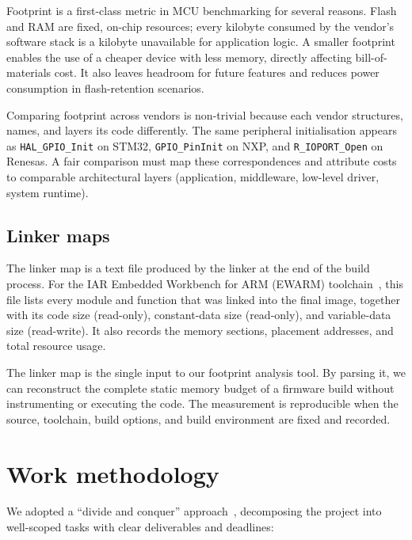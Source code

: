 Footprint is a first-class metric in MCU benchmarking for several reasons. Flash and RAM
are fixed, on-chip resources; every kilobyte consumed by the vendor's software stack is a
kilobyte unavailable for application logic. A smaller footprint enables the use of a
cheaper device with less memory, directly affecting bill-of-materials cost. It also leaves
headroom for future features and reduces power consumption in flash-retention scenarios.

Comparing footprint across vendors is non-trivial because each vendor structures, names,
and layers its code differently. The same peripheral initialisation appears as
\texttt{HAL\_GPIO\_Init} on STM32, \texttt{GPIO\_PinInit} on NXP, and \texttt{R\_IOPORT\_Open}
on Renesas. A fair comparison must map these correspondences and attribute costs to
comparable architectural layers (application, middleware, low-level driver, system runtime).

\subsection{Linker maps}
\label{sec:linker-maps}

The linker map is a text file produced by the linker at the end of the build process. For
the IAR Embedded Workbench for ARM (EWARM) toolchain~\cite{iar-ewarm}, this file lists
every module and function that was linked into the final image, together with its code size
(read-only), constant-data size (read-only), and variable-data size (read-write). It also
records the memory sections, placement addresses, and total resource usage.

The linker map is the single input to our footprint analysis tool. By parsing it, we can
reconstruct the complete static memory budget of a firmware build without instrumenting or
executing the code. The measurement is reproducible when the source, toolchain, build
options, and build environment are fixed and recorded.

\section{Work methodology}
\label{sec:methodology}

We adopted a ``divide and conquer'' approach~\cite{divide-conquer}, decomposing the project
into well-scoped tasks with clear deliverables and deadlines:

